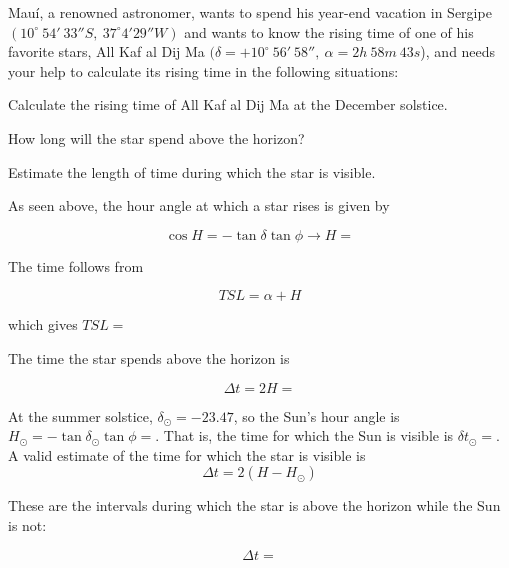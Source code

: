 \documentclass[11pt]{article}
\begin{document}
\begin{pproblem}
    Mauí, a renowned astronomer, wants to spend his year-end vacation in Sergipe \((10^\circ \ 54'\ 33'' S, \ 37^\circ 4'29'' W)\) and wants to know the rising time of one of his favorite stars, All Kaf al Dij Ma  \((\delta = +10^\circ \ 56'\ 58'', \ \alpha = 2h \ 58m \ 43s\)), and needs your help to calculate its rising time in the following situations:
    
    \begin{alternativas}
        \item Calculate the rising time of All Kaf al Dij Ma  at the December solstice.
        \item How long will the star spend above the horizon?
        \item Estimate the length of time during which the star is visible.
    \end{alternativas}

\begin{pssolution*}{}{ }
    \begin{alternativas}
        \item As seen above, the hour angle at which a star rises is given by 

        \[\cos H = - \tan \delta \tan \phi \rightarrow H = \]

        The time follows from 

        \[TSL = \alpha + H\]

        which gives \(\boxed{TSL = }\)

        \item The time the star spends above the horizon is 
        
        \[\Delta t = 2 H = \]

        \item At the summer solstice, \(\delta_\odot = -23.47\), so the Sun's hour angle is \(H_\odot = -\tan\delta_\odot \tan\phi = \). That is, the time for which the Sun is visible is \(\delta t_\odot = \). A valid estimate of the time for which the star is visible is 
        \[\Delta t = 2 (H - H_\odot)\]

        These are the intervals during which the star is above the horizon while the Sun is not: 
       
        \[\boxed{\Delta t = }\]
    \end{alternativas}
\end{pssolution*}
\end{pproblem}
\end{document}
